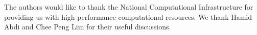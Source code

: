 \documentclass[journal]{IEEEtran}
\begin{document}
The authors would like to thank the National Computational Infrastructure for providing us with high-performance computational resources. We thank Hamid Abdi and Chee Peng Lim for their useful discussions.


\ifCLASSOPTIONcaptionsoff
  \newpage
\fi{\small


}



%
%
%

% 



\end{document}
